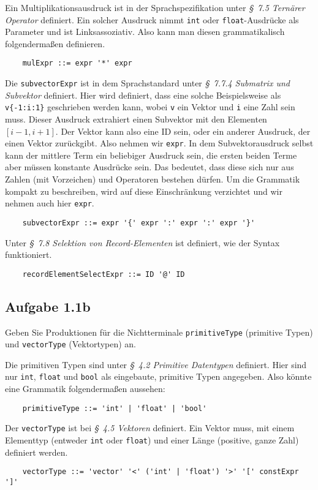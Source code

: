 \documentclass[
  ngerman,
  DIV=14
]{scrartcl}
\begin{document}
\bigskip\noindent
Ein Multiplikationsausdruck ist in der Sprachspezifikation unter \emph{§~7.5 Ternärer Operator} definiert. Ein solcher Ausdruck nimmt \verb|int| oder \verb|float|-Ausdrücke als Parameter und ist Linksassoziativ. Also kann man diesen grammatikalisch folgendermaßen definieren. 
\begin{verbatim}
    mulExpr ::= expr '*' expr
\end{verbatim}
Die \verb|subvectorExpr| ist in dem Sprachstandard unter \emph{§~7.7.4 Submatrix und Subvektor} definiert. Hier wird definiert, dass eine solche Beispielsweise als \verb|v{-1:i:1}| geschrieben werden kann, wobei \verb|v| ein Vektor und \verb|i| eine Zahl sein muss. Dieser Ausdruck extrahiert einen Subvektor mit den Elementen $[i-1, i+1]$. Der Vektor kann also eine ID sein, oder ein anderer Ausdruck, der einen Vektor zurückgibt. Also nehmen wir \texttt{expr}. In dem Subvektorausdruck selbst kann der mittlere Term ein beliebiger Ausdruck sein, die ersten beiden Terme aber müssen konstante Ausdrücke sein. Das bedeutet, dass diese sich nur aus Zahlen (mit Vorzeichen) und Operatoren bestehen dürfen. Um die Grammatik kompakt zu beschreiben, wird auf diese Einschränkung verzichtet und wir nehmen auch hier \texttt{expr}.
\begin{verbatim}
    subvectorExpr ::= expr '{' expr ':' expr ':' expr '}'  
\end{verbatim}
Unter \emph{§~7.8 Selektion von Record-Elementen} ist definiert, wie der Syntax funktioniert.
\begin{verbatim}
    recordElementSelectExpr ::= ID '@' ID  
\end{verbatim}

\subsection*{Aufgabe 1.1b}

Geben Sie Produktionen für die Nichtterminale \verb|primitiveType| (primitive Typen) und \verb|vectorType| (Vektortypen) an.

\bigskip\noindent
Die primitiven Typen sind unter \emph{§~4.2 Primitive Datentypen} definiert. Hier sind nur \texttt{int}, \texttt{float} und \texttt{bool} als eingebaute, primitive Typen angegeben. Also könnte eine Grammatik folgendermaßen aussehen:
\begin{verbatim}
    primitiveType ::= 'int' | 'float' | 'bool'
\end{verbatim}
Der \texttt{vectorType} ist bei \emph{§~4.5 Vektoren} definiert. Ein Vektor muss, mit einem Elementtyp (entweder \texttt{int} oder \texttt{float}) und einer Länge (positive, ganze Zahl) definiert werden.
\begin{verbatim}
    vectorType ::= 'vector' '<' ('int' | 'float') '>' '[' constExpr ']'
\end{verbatim}
\end{document}
